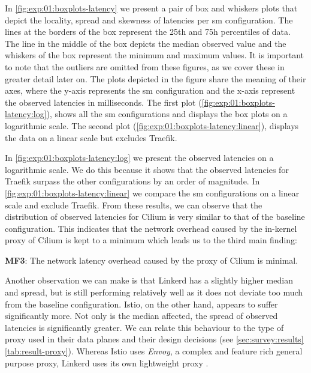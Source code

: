 In \cref{fig:exp:01:boxplots-latency} we present a pair of box and whiskers plots that depict the locality, spread and skewness of latencies per \gls{sm} configuration. The lines at the borders of the box represent the 25th and 75h percentiles of data. The line in the middle of the box depicts the median observed value and the whiskers of the box represent the minimum and maximum values. It is important to note that the outliers are omitted from these figures, as we cover these in greater detail later on. The plots depicted in the figure share the meaning of their axes, where the y-axis represents the \gls{sm} configuration and the x-axis represent the observed latencies in milliseconds. The first plot (\cref{fig:exp:01:boxplots-latency:log}), shows all the \gls{sm} configurations and displays the box plots on a logarithmic scale. The second plot (\cref{fig:exp:01:boxplots-latency:linear}), displays the data on a linear scale but excludes Traefik.

In \cref{fig:exp:01:boxplots-latency:log} we present the observed latencies on a logarithmic scale. We do this because it shows that the observed latencies for Traefik surpass the other configurations by an order of magnitude. In \cref{fig:exp:01:boxplots-latency:linear} we compare the \gls{sm} configurations on a linear scale and exclude Traefik. From these results, we can observe that the distribution of observed latencies for Cilium is very similar to that of the baseline configuration. This indicates that the network overhead caused by the in-kernel proxy of Cilium is kept to a minimum which leads us to the third main finding:

\begin{shaded*}
    \noindent
    \textbf{MF3}: 
    The network latency overhead caused by the proxy of Cilium is minimal.
\end{shaded*}

Another observation we can make is that Linkerd has a slightly higher median and spread, but is still performing relatively well as it does not deviate too much from the baseline configuration. Istio, on the other hand, appears to suffer significantly more. Not only is the median affected, the spread of observed latencies is significantly greater. We can relate this behaviour to the type of proxy used in their data planes and their design decisions (see \cref{sec:survey:results} \cref{tab:result-proxy}). Whereas Istio uses \textit{Envoy}, a complex and feature rich general purpose proxy, Linkerd uses its own lightweight proxy \cite{linkerd-no-envoy}.


